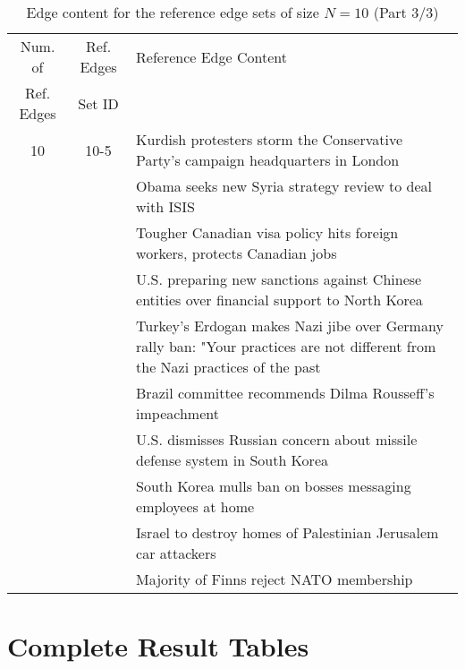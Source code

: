 \begin{table}[H]
\begin{tabular}{cc p{10cm}}
\toprule
\multicolumn{1}{c}{Num. of}			& \multicolumn{1}{c}{Ref. Edges}		& \multicolumn{1}{l}{Reference Edge Content} \\
\multicolumn{1}{c}{Ref. Edges}		& \multicolumn{1}{c}{Set ID}			& \multicolumn{1}{c}{} \\
\midrule
10 & 10-5 & Kurdish protesters storm the Conservative Party's campaign headquarters in London \\
 &  & Obama seeks new Syria strategy review to deal with ISIS \\
 &  & Tougher Canadian visa policy hits foreign workers, protects Canadian jobs \\
 &  & U.S. preparing new sanctions against Chinese entities over financial support to North Korea \\
 &  & Turkey's Erdogan makes Nazi jibe over Germany rally ban: "Your practices are not different from the Nazi practices of the past \\
 &  & Brazil committee recommends Dilma Rousseff's impeachment \\
 &  & U.S. dismisses Russian concern about missile defense system in South Korea \\
 &  & South Korea mulls ban on bosses messaging employees at home \\
 &  & Israel to destroy homes of Palestinian Jerusalem car attackers \\
 &  & Majority of Finns reject NATO membership \\
\bottomrule
\end{tabular}
\caption{Edge content for the reference edge sets of size \(N = 10\) (Part 3/3)}
\label{tab:ref-edge-sets-nref-10-part-3}
\end{table}

\section{Complete Result Tables}
\label{app-sec:result-tables}

